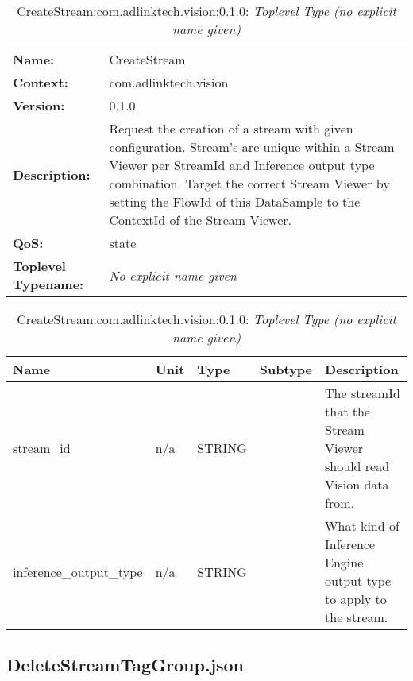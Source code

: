 \begin{table}[H]
\begin{tabularx}{\textwidth}{l X} 
       \textbf{Name:} & CreateStream \\ 
	   \textbf{Context:} & com.adlinktech.vision \\ 
	   \textbf{Version:} & 0.1.0 \\ 
	   \textbf{Description:} & Request the creation of a stream with given configuration. Stream's are unique within a Stream Viewer per StreamId and Inference output type combination. Target the correct Stream Viewer by setting the FlowId of this DataSample to the ContextId of the Stream Viewer. \\ 
	   \textbf{QoS:} & state \\
	   \textbf{Toplevel Typename:} & \textit{No explicit name given} \\ 
\end{tabularx}
\caption{CreateStream:com.adlinktech.vision:0.1.0}\label{CreateStreamTagGroup.json:table:CreateStream}
\bigskip
\begin{tabularx}{\textwidth}{l l l l X} 
	 \textbf{Name} & \textbf{Unit} & \textbf{Type} & \textbf{Subtype} & \textbf{Description} \\
	 \midrule
   stream\_id & n/a & STRING &  & The streamId that the Stream Viewer should read Vision data from. \\
   inference\_output\_type & n/a & STRING &  & What kind of Inference Engine output type to apply to the stream. \\
\end{tabularx}
\caption{CreateStream:com.adlinktech.vision:0.1.0: \textit{Toplevel Type (no explicit name given)}}\label{CreateStreamTagGroup.json:table:CreateStream-no-type-given}


\end{table}

\subsection{DeleteStreamTagGroup.json}

